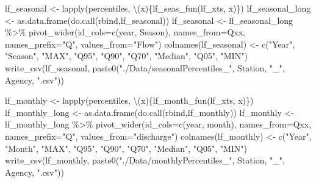 \documentclass[
]{article}
\newenvironment{Shaded}{\begin{snugshade}}{\end{snugshade}}
\newcommand{\AttributeTok}[1]{\textcolor[rgb]{0.77,0.63,0.00}{#1}}
\newcommand{\FunctionTok}[1]{\textcolor[rgb]{0.00,0.00,0.00}{#1}}
\newcommand{\NormalTok}[1]{#1}
\newcommand{\OtherTok}[1]{\textcolor[rgb]{0.56,0.35,0.01}{#1}}
\newcommand{\SpecialCharTok}[1]{\textcolor[rgb]{0.00,0.00,0.00}{#1}}
\newcommand{\StringTok}[1]{\textcolor[rgb]{0.31,0.60,0.02}{#1}}
\begin{document}
\begin{Shaded}
\begin{Highlighting}[]
\NormalTok{lf\_seasonal }\OtherTok{\textless{}{-}} \FunctionTok{lapply}\NormalTok{(percentiles, \textbackslash{}(x)\{}\FunctionTok{lf\_seas\_fun}\NormalTok{(lf\_xts, x)\})}
\NormalTok{lf\_seasonal\_long }\OtherTok{\textless{}{-}} \FunctionTok{as.data.frame}\NormalTok{(}\FunctionTok{do.call}\NormalTok{(rbind,lf\_seasonal))}
\NormalTok{lf\_seasonal }\OtherTok{\textless{}{-}}\NormalTok{ lf\_seasonal\_long }\SpecialCharTok{\%\textgreater{}\%} 
  \FunctionTok{pivot\_wider}\NormalTok{(}\AttributeTok{id\_cols=}\FunctionTok{c}\NormalTok{(year, Season), }\AttributeTok{names\_from=}\NormalTok{Qxx, }\AttributeTok{names\_prefix=}\StringTok{"Q"}\NormalTok{,}
              \AttributeTok{values\_from=}\StringTok{"Flow"}\NormalTok{)}
\FunctionTok{colnames}\NormalTok{(lf\_seasonal) }\OtherTok{\textless{}{-}} 
  \FunctionTok{c}\NormalTok{(}\StringTok{"Year"}\NormalTok{, }\StringTok{"Season"}\NormalTok{, }\StringTok{"MAX"}\NormalTok{, }\StringTok{"Q95"}\NormalTok{, }\StringTok{"Q90"}\NormalTok{, }\StringTok{"Q70"}\NormalTok{, }\StringTok{"Median"}\NormalTok{, }\StringTok{"Q05"}\NormalTok{, }\StringTok{"MIN"}\NormalTok{)}
\FunctionTok{write\_csv}\NormalTok{(lf\_seasonal, }\FunctionTok{paste0}\NormalTok{(}\StringTok{"./Data/seasonalPercentiles\_"}\NormalTok{, }
\NormalTok{                          Station, }\StringTok{"\_"}\NormalTok{, Agency, }\StringTok{".csv"}\NormalTok{))}

\NormalTok{lf\_monthly }\OtherTok{\textless{}{-}} \FunctionTok{lapply}\NormalTok{(percentiles, \textbackslash{}(x)\{}\FunctionTok{lf\_month\_fun}\NormalTok{(lf\_xts, x)\})}
\NormalTok{lf\_monthly\_long }\OtherTok{\textless{}{-}} \FunctionTok{as.data.frame}\NormalTok{(}\FunctionTok{do.call}\NormalTok{(rbind,lf\_monthly))}
\NormalTok{lf\_monthly }\OtherTok{\textless{}{-}}\NormalTok{ lf\_monthly\_long }\SpecialCharTok{\%\textgreater{}\%} 
  \FunctionTok{pivot\_wider}\NormalTok{(}\AttributeTok{id\_cols=}\FunctionTok{c}\NormalTok{(year, month), }\AttributeTok{names\_from=}\NormalTok{Qxx, }\AttributeTok{names\_prefix=}\StringTok{"Q"}\NormalTok{,}
              \AttributeTok{values\_from=}\StringTok{"discharge"}\NormalTok{)}
\FunctionTok{colnames}\NormalTok{(lf\_monthly) }\OtherTok{\textless{}{-}} 
  \FunctionTok{c}\NormalTok{(}\StringTok{"Year"}\NormalTok{, }\StringTok{"Month"}\NormalTok{, }\StringTok{"MAX"}\NormalTok{, }\StringTok{"Q95"}\NormalTok{, }\StringTok{"Q90"}\NormalTok{, }\StringTok{"Q70"}\NormalTok{, }\StringTok{"Median"}\NormalTok{, }\StringTok{"Q05"}\NormalTok{, }\StringTok{"MIN"}\NormalTok{)}
\FunctionTok{write\_csv}\NormalTok{(lf\_monthly, }\FunctionTok{paste0}\NormalTok{(}\StringTok{"./Data/monthlyPercentiles\_"}\NormalTok{, }
\NormalTok{                          Station, }\StringTok{"\_"}\NormalTok{, Agency, }\StringTok{".csv"}\NormalTok{))}
\end{Highlighting}
\end{Shaded}
\end{document}
